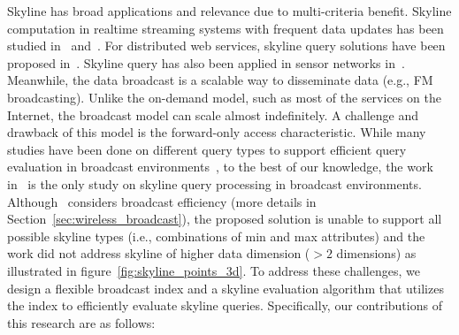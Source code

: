 Skyline has broad applications and relevance due to multi-criteria
benefit. Skyline computation in realtime streaming systems with
frequent data updates has been studied in~\cite{Lin05stabbingthe}
and~\cite{Tao06maintainingsliding}. For distributed web services,
skyline query solutions have been proposed
in~\cite{Balke04efficientdistributed}. Skyline query has also been
applied in sensor networks
in~\cite{Seong:2009:ESQ:1644993.1645022}. Meanwhile, the data
broadcast is a scalable way to disseminate data (e.g., FM
broadcasting). Unlike the on-demand model, such as most of the
services on the Internet, the broadcast model can scale almost
indefinitely. A challenge and drawback of this model is the
forward-only access characteristic. While many studies have been
done on different query types to support efficient query
evaluation in broadcast
environments~\cite{DBLP:journals/tmc/KuZW08,dsi,DBLP:conf/cikm/Hara02},
to the best of our knowledge, the work
in~\cite{Ha:2009:EEP:1616994.1617050} is the only study on skyline
query processing in broadcast environments.
Although~\cite{Ha:2009:EEP:1616994.1617050} considers broadcast
efficiency (more details in Section~\ref{sec:wireless_broadcast}),
the proposed solution is unable to support all possible skyline
types (i.e., combinations of min and max attributes) and the work
did not address skyline of higher data dimension ($>2$ dimensions)
as illustrated in figure~\ref{fig:skyline_points_3d}. To address
these challenges, we design a flexible broadcast index and a
skyline evaluation algorithm that utilizes the index to
efficiently evaluate skyline queries. Specifically, our
contributions of this research are as follows:



